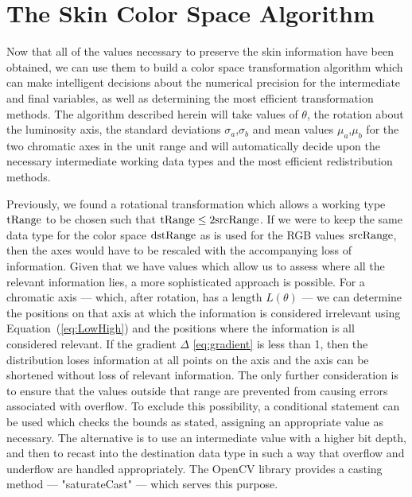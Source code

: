 \section{The Skin Color Space Algorithm}
\newcommand{\uSTD}[1]{\sigma_#1}
\newcommand{\STD}[1]{\text{s}_#1}
\newcommand{\uMean}[1]{\mu_#1}
\newcommand{\mean}[1]{\text{c}_#1}

Now that all of the values necessary to preserve the skin information have been obtained, we can use them to build a color space transformation algorithm which can make intelligent decisions about the numerical precision for the intermediate and final variables, as well as determining the most efficient transformation methods. The algorithm described herein will take values of $\theta$, the rotation about the luminosity axis, the standard deviations $ \uSTD{a}$,$ \uSTD{b}$ and mean values $ \uMean{a}$,$ \uMean{b}$ for the two chromatic axes in the unit range  and will automatically decide upon the necessary intermediate working data types and the most efficient redistribution methods.

Previously, we found a rotational transformation which allows a working type $\text{tRange}$ to be chosen such that $\text{tRange} \le 2 \text{srcRange}$. If we were to keep the same data type for the color space $\text{dstRange}$ as is used for the RGB values $\text{srcRange}$, then the axes would have to be rescaled with the accompanying loss of information. Given that we have values which allow us to assess where all the relevant information lies, a more sophisticated approach is possible. For a chromatic axis --- which, after rotation, has a length $L(\theta)$ --- we can determine the positions on that axis at which the information is considered irrelevant using Equation~(\ref{eq:LowHigh}) and the positions where the information is all considered relevant. If the gradient $ \Delta$ \ref{eq:gradient} is less than 1, then the distribution loses information at all points on the axis and the axis can be shortened without loss of relevant information. The only further consideration is to ensure that the values outside that range are prevented from causing errors associated with overflow. To exclude this possibility, a conditional statement can be used which checks the bounds as stated, assigning an appropriate value as necessary. The alternative is to use an intermediate value with a higher bit depth, and then to recast into the destination data type in such a way that overflow and underflow are handled appropriately. The OpenCV library provides a casting method --- "saturateCast" --- which serves this purpose.

